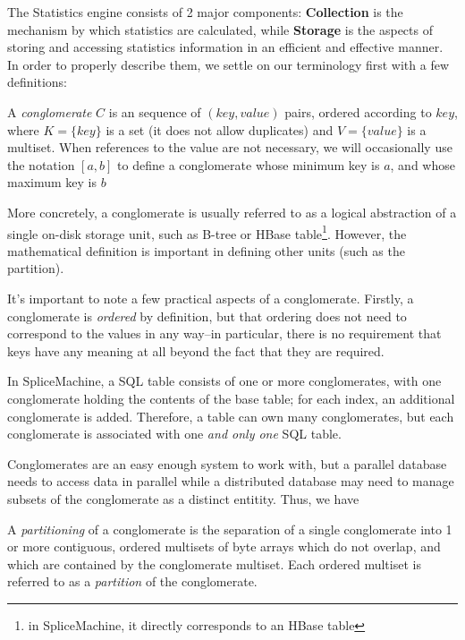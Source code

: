 The Statistics engine consists of 2 major components: \textbf{Collection} is the mechanism by which statistics are calculated, while \textbf{Storage} is the aspects of storing and accessing statistics information in an efficient and effective manner. In order to properly describe them, we settle on our terminology first with a few definitions:

\begin{definition}
A \emph{conglomerate} $C$ is an sequence of $(key,value)$ pairs, ordered according to $key$, where $K = \lbrace key \rbrace$ is a set (it does not allow duplicates) and $V = \lbrace value \rbrace$ is a multiset. When references to the value are not necessary, we will occasionally use the notation $[a,b]$ to define a conglomerate whose minimum key is $a$, and whose maximum key is $b$
\end{definition}

More concretely, a conglomerate is usually referred to as a logical abstraction of a single on-disk storage unit, such as B-tree or HBase table\footnote{in SpliceMachine, it directly corresponds to an HBase table}. However, the mathematical definition is important in defining other units (such as the partition).

It's important to note a few practical aspects of a conglomerate. Firstly, a conglomerate is \emph{ordered} by definition, but that ordering does not need to correspond to the values in any way--in particular, there is no requirement that keys have any meaning at all beyond the fact that they are required.

In SpliceMachine, a SQL table consists of one or more conglomerates, with one conglomerate holding the contents of the base table; for each index, an additional conglomerate is added. Therefore, a table can own many conglomerates, but each conglomerate is associated with one \emph{and only one} SQL table.

Conglomerates are an easy enough system to work with, but a parallel database needs to access data in parallel while a distributed database may need to manage subsets of the conglomerate as a distinct entitity. Thus, we have

\begin{definition}
A \emph{partitioning} of a conglomerate is the separation of a single conglomerate into 1 or more contiguous, ordered multisets of byte arrays which do not overlap, and which are contained by the conglomerate multiset. Each ordered multiset is referred to as a \emph{partition} of the conglomerate.
\end{definition}


